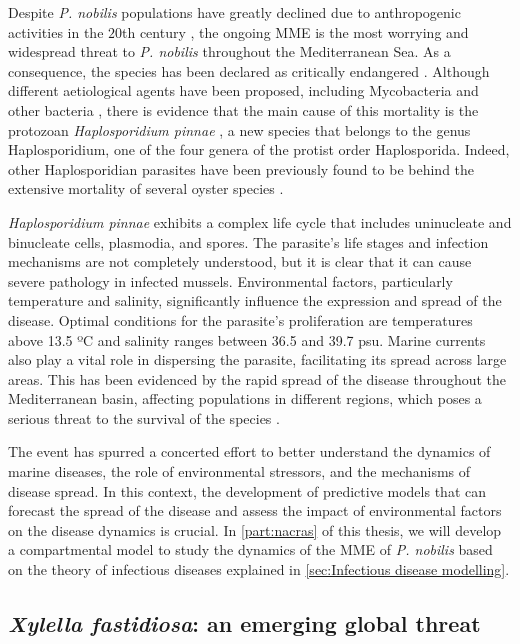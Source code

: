 Despite \textit{P. nobilis} populations have greatly declined due to
anthropogenic activities in the $20$th century \cite{VAZQUEZ2017}, the
ongoing
MME is the most worrying and widespread threat to \textit{P. nobilis}
throughout the Mediterranean Sea. As a consequence, the species has been
declared as critically endangered \cite{IUCN}. Although different
aetiological
agents have been proposed, including Mycobacteria and other bacteria
\cite{Carella2019, Saric2020, Scarpa2020}, there is evidence that the main
cause of this mortality is the protozoan \textit{Haplosporidium pinnae}
\cite{DARRIBA201714, CATANESE20189, Box2020}, a new species that belongs to
the genus Haplosporidium, one of the four genera of the protist order
Haplosporida. Indeed, other Haplosporidian parasites have been previously
found
to be behind the extensive mortality of several oyster species
\cite{Burreson2004, Arzul2015}.

\textit{Haplosporidium pinnae} exhibits a complex life cycle that includes
uninucleate and binucleate cells, plasmodia, and spores. The parasite's life
stages and infection mechanisms are not completely understood, but it is
clear
that it can cause severe pathology in infected mussels. Environmental
factors,
particularly temperature and salinity, significantly influence the expression
and spread of the disease. Optimal conditions for the parasite's
proliferation
are temperatures above 13.5 ºC and salinity ranges between 36.5 and 39.7 psu.
Marine currents also play a vital role in dispersing the parasite,
facilitating
its spread across large areas. This has been evidenced by the rapid spread of
the disease throughout the Mediterranean basin, affecting populations in
different regions, which poses a serious threat to the survival of the
species
\cite{Cabanellas2019}.

The event has spurred a concerted effort to better understand the dynamics of
marine diseases, the role of environmental stressors, and the mechanisms of
disease spread. In this context, the development of predictive models that
can
forecast the spread of the disease and assess the impact of environmental
factors on the disease dynamics is crucial. In \cref{part:nacras} of this
thesis, we will develop a compartmental model to study the dynamics of the MME
of \textit{P. nobilis} based on the theory of infectious diseases explained
in \cref{sec:Infectious disease modelling}.

\subsection{\label{sec:Xylella fastidiosa: an emerging global
    threat}\textit{Xylella
    fastidiosa}: an emerging global threat}

